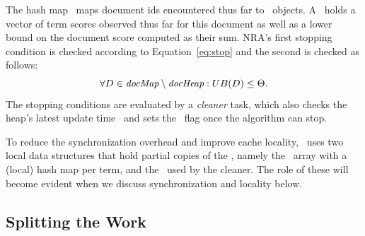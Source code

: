 The hash map 
\DMap\ maps document ids encountered thus far to  \Docobj\ objects. A \Docobj\ holds a vector of term scores observed thus far for this document as well as a lower bound on the document score computed as their sum.
NRA's first stopping condition is checked 
according to Equation~\ref{eq:stop} 
and the 
second  is checked as follows: 
\begin{equation} \label{eq:stop2}
\forall D\in \textit{docMap} \setminus \textit{docHeap} : UB(D) \le \Theta.
\end{equation}
The stopping conditions are evaluated by a \emph{cleaner} task,
which also checks the heap's latest update time \HeapUpdateTime\ and 
sets the \Done\ flag once the algorithm can stop.





To reduce the synchronization overhead and improve cache locality, \alg\ uses two local data structures that hold partial copies of the  \DMap, namely the \TMap\ array with a (local) hash map per term, 
and the \LDMap\ used by the cleaner. The role of these will become evident when we discuss synchronization and locality below.

\subsection{Splitting the Work}
\label{sssec:tasks}



